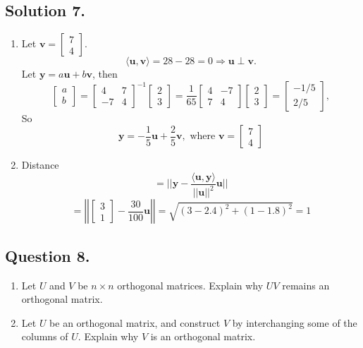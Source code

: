 \documentclass{article}
\begin{document}
\subsection*{Solution 7.}
\begin{enumerate} [label=(\arabic*)]
    \item Let $\mathbf{v}=\left[\begin{array}{r}7\\4\end{array}\right]$.
    \[\langle \mathbf{u},\mathbf{v}\rangle=28-28=0\Rightarrow \mathbf{u}\perp\mathbf{v}.\]
    Let $\mathbf{y}=a\mathbf{u}+b\mathbf{v}$, then 
    \[\left[\begin{array}{r}a\\b\end{array}\right]=\left[\begin{array}{rr}4&7\\-7&4\end{array}\right]^{-1}\left[\begin{array}{r}2\\3\end{array}\right]=\frac{1}{65}\left[\begin{array}{rr}4&-7\\7&4\end{array}\right]\left[\begin{array}{r}2\\3\end{array}\right]=\left[\begin{array}{r}-1/5\\2/5\end{array}\right],\]
    So
    \[\mathbf{y}=-\frac{1}{5} \mathbf{u}+\frac{2}{5}\mathbf{v},\text{ where }\mathbf{v}=\left[\begin{array}{r}7\\4\end{array}\right]\]
    \item Distance
    \[=||\mathbf{y}-\frac{\langle \mathbf{u},\mathbf{y}\rangle}{||\mathbf{u}||^2}\mathbf{u}||\]
    \[=\left\vert\left\vert\left[\begin{array}{r} 3\\1\end{array}\right]-\frac{30}{100}\mathbf{u}\right\vert\right\vert=\sqrt{(3-2.4)^2+(1-1.8)^2}=1\]
\end{enumerate}
\subsection*{Question 8.}
\begin{enumerate} [label=(\arabic*)]
    \item Let $U$ and $V$ be $n\times n$ orthogonal matrices. Explain why $UV$ remains an orthogonal matrix.
    \item Let $U$ be an orthogonal matrix, and construct $V$ by interchanging some of the columns of $U$. Explain why $V$ is an orthogonal matrix.
\end{enumerate}
\end{document}
